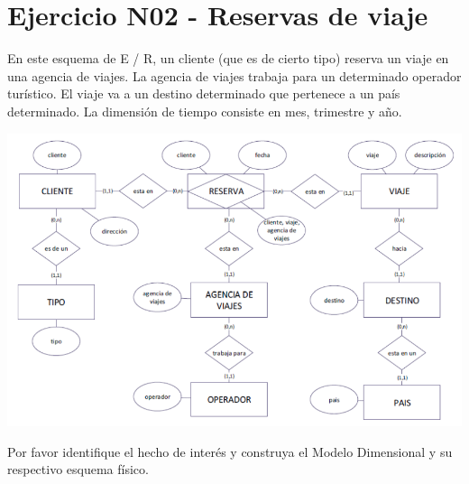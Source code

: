 \section{Ejercicio N02 - Reservas de viaje} 

En este esquema de E / R, un cliente (que es de cierto tipo) reserva un viaje en una agencia de viajes. La agencia de viajes
trabaja para un determinado operador turístico. El viaje va a un destino determinado que pertenece a un país determinado.
La dimensión de tiempo consiste en mes, trimestre y año.

	\begin{center}
	\includegraphics[width=17cm]{./Imagenes/ejercicio2}
	\end{center}	

Por favor identifique el hecho de interés y construya el Modelo Dimensional y su respectivo esquema físico.
\\

